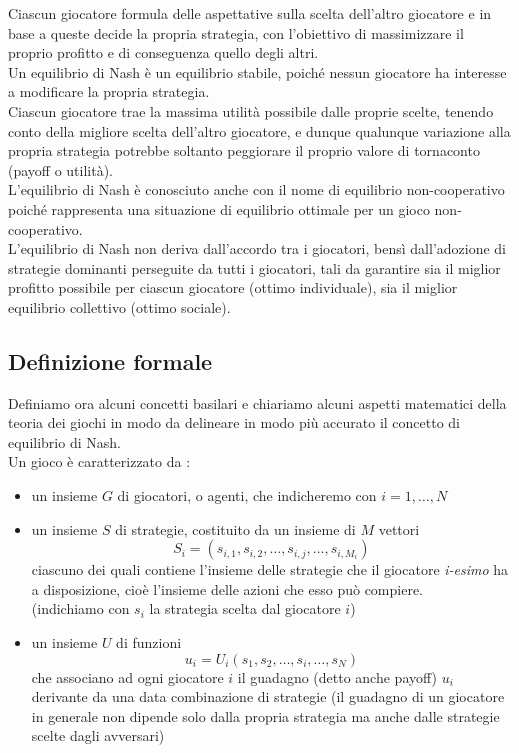 Ciascun giocatore formula delle aspettative sulla scelta dell'altro giocatore e in base a queste decide la propria strategia, con l'obiettivo di massimizzare il proprio profitto e di conseguenza quello degli altri.\\

Un equilibrio di Nash è un equilibrio stabile, poiché nessun giocatore ha interesse a modificare la propria strategia.\\

Ciascun giocatore trae la massima utilità possibile dalle proprie scelte, tenendo conto della migliore scelta dell'altro giocatore, e dunque qualunque variazione alla propria strategia potrebbe soltanto peggiorare il proprio valore di tornaconto (payoff o utilità).\\

L'equilibrio di Nash è conosciuto anche con il nome di equilibrio non-cooperativo poiché rappresenta una situazione di equilibrio ottimale per un gioco non-cooperativo.\\

L'equilibrio di Nash non deriva dall'accordo tra i giocatori, bensì dall'adozione di strategie dominanti perseguite da tutti i giocatori, tali da garantire sia il miglior profitto possibile per ciascun giocatore (ottimo individuale), sia il miglior equilibrio collettivo (ottimo sociale).\\

\subsection{Definizione formale}
\justify
Definiamo ora alcuni concetti basilari e chiariamo alcuni aspetti matematici della teoria dei giochi in modo da delineare in modo più accurato il concetto di equilibrio di Nash.\\

Un gioco è caratterizzato da :

\begin{itemize}
	\item un insieme \(G\) di giocatori, o agenti, che indicheremo con \(i = 1,\ldots,N\)
	\item un insieme \(S\) di strategie, costituito da un insieme di \(M\) vettori \[S_{i}=\left(s_{{i,1}},s_{{i,2}},\ldots,s_{{i,j}},\ldots,s_{{i,M_{i}}}\right)\] ciascuno dei quali contiene l'insieme delle strategie che il giocatore \textit{i-esimo} ha a disposizione, cioè l'insieme delle azioni che esso può compiere.\\(indichiamo con \(s_i\) la strategia scelta dal giocatore \(i\))
	\item un insieme \(U\) di funzioni \[u_{i}=U_{i}\left(s_{1},s_{2},\ldots,s_{i},\ldots,s_{N}\right)\] che associano ad ogni giocatore \(i\) il guadagno (detto anche payoff) \(u_i\) derivante da una data combinazione di strategie (il guadagno di un giocatore in generale non dipende solo dalla propria strategia ma anche dalle strategie scelte dagli avversari)
\end{itemize}

